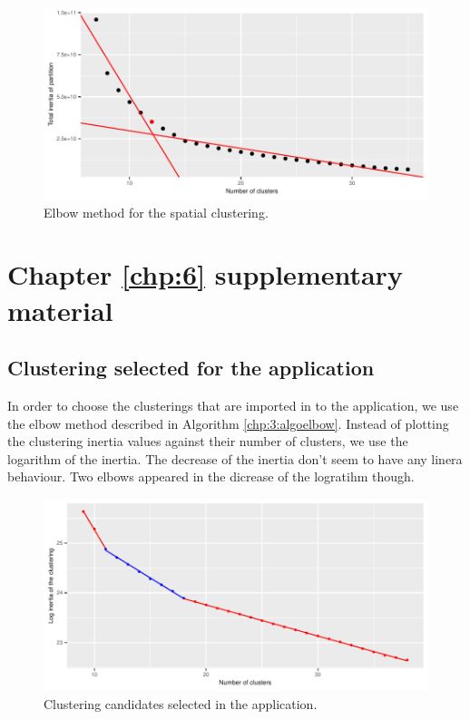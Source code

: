 \begin{appendices}
\begin{figure}[H]
  \centering
  \includegraphics[]{figs/Chap5/Elb_clust.pdf}
  \caption{Elbow method for the spatial clustering.}
  \label{fig:elb:clust}
\end{figure}

\chapter{Chapter \ref{chp:6} supplementary material} \label{app:chap6}

\section{Clustering selected for the application}\label{app:chap6:1}

In order to choose the clusterings that are imported in to the application, we use the elbow method described in Algorithm \ref{chp:3:algoelbow}. Instead of plotting the clustering inertia values against their number of clusters, we use the logarithm of the inertia. The decrease of the inertia don't seem to have any linera behaviour. Two elbows appeared in the dicrease of the logratihm though.  

\begin{figure}[H]
  \centering
  \includegraphics[]{figs/App/NB_CLUST.pdf}
  \caption{Clustering candidates selected in the application.}
  \label{fig:elb:clust}
\end{figure}


\end{appendices}
